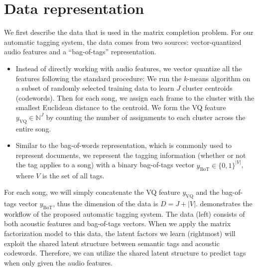 \section{Data representation} \label{chpt:tagging:sec:data}
We first describe the data that is used in the matrix completion problem. For our automatic tagging system, the data comes from two sources: vector-quantized audio features and a ``bag-of-tags'' representation. 
\begin{itemize}
\item {} Instead of directly working with audio features, we vector quantize all the features following the standard procedure: We run the $k$-means algorithm on a subset of randomly selected training data to learn $J$ cluster centroids (codewords). Then for each song, we assign each frame to the cluster with the smallest Euclidean distance to the centroid. We form the VQ feature $y_{\text{VQ}} \in \mathbb{N}^J$ by counting the number of assignments to each cluster across the entire song. 

\item {} Similar to the bag-of-words representation, which is commonly used to represent documents, we represent the tagging information (whether or not the tag applies to a song) with a binary bag-of-tags vector $y_{\text{BoT}}\in \{0, 1\}^{|V|}$, where $V$ is the set of all tags. \end{itemize}

For each song, we will simply concatenate the VQ feature $y_{\text{VQ}}$ and the bag-of-tags vector $y_{\text{BoT}}$, thus the dimension of the data is $D = J + |V|$.  demonstrates the workflow of the proposed automatic tagging system. The data (left) consists of both acoustic features and bag-of-tags vectors. When we apply the matrix factorization model to this data, the latent factors we learn (rightmost) will exploit the shared latent structure between semantic tags and acoustic codewords. Therefore, we can utilize the shared latent structure to predict tags when only given the audio features. 

